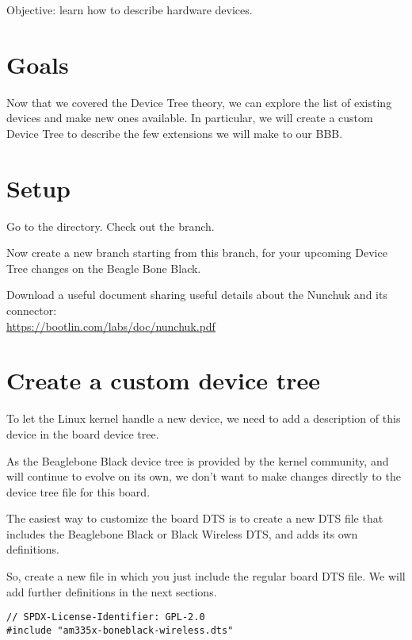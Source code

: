 {Objective: learn how to describe hardware devices.}

\section{Goals}

Now that we covered the Device Tree theory, we can explore the list of
existing devices and make new ones available. In particular, we will
create a custom Device Tree to describe the few extensions we will make
to our BBB.

\section{Setup}

Go to the  directory. Check out the
 branch.

Now create a new  branch starting from this branch,
for your upcoming Device Tree changes on the Beagle Bone Black.

Download a useful document sharing useful details about the Nunchuk
and its connector:\\
\url{https://bootlin.com/labs/doc/nunchuk.pdf}

\section{Create a custom device tree}

To let the Linux kernel handle a new device, we need to add a
description of this device in the board device tree.

As the Beaglebone Black device tree is provided by the kernel community,
and will continue to evolve on its own, we don't want to make changes
directly to the device tree file for this board.

The easiest way to customize the board DTS is to create a new DTS file
that includes the Beaglebone Black or Black Wireless DTS, and adds
its own definitions.

So, create a new
 file in which
you just include the regular board DTS file. We will add further
definitions in the next sections.

\begin{verbatim}
// SPDX-License-Identifier: GPL-2.0
#include "am335x-boneblack-wireless.dts"
\end{verbatim}

